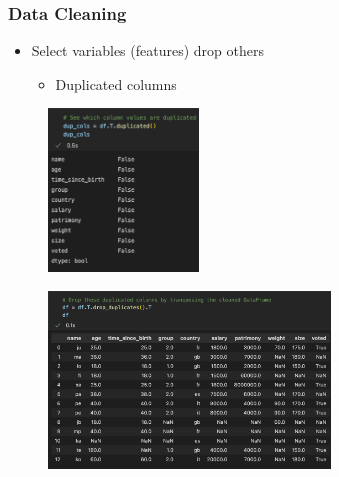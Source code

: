 \begin{frame}\frametitle{Data Cleaning}
   \begin{itemize}
      \item Select variables (features) drop others
      \begin{itemize}
         \item Duplicated columns
      \end{itemize}
   \end{itemize}
   \vspace{1cm}
   \begin{minipage}{0.38\linewidth}
      \begin{figure}[H]
         \includegraphics[width=4cm]{../images/illustrations/data_cleaning_detect_columns_duplicates.png}
      \end{figure}
   \end{minipage}
   \begin{minipage}{0.58\linewidth}
      \begin{figure}[H]
         \includegraphics[width=7.5cm]{../images/illustrations/data_cleaning_drop_columns_duplicates.png}
      \end{figure}
   \end{minipage}
\end{frame}




